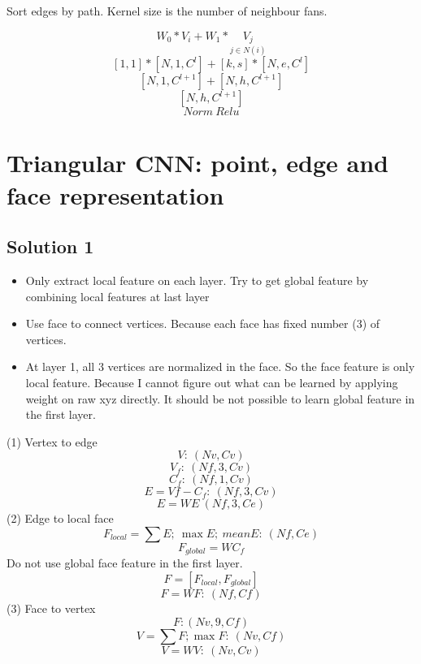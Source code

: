 \documentclass[,table,dvipsnames]{article}
\begin{document}
Sort edges by path. Kernel size is the number of neighbour fans.

$$ W_0 * V_i + W_1 *  \underset{j\in N(i)}{V_j} $$
$$ [1,1]*[N,1,C^l] + [k,s]*[N,e,C^l] $$
$$ [N,1,C^{l+1}]+ [N,h,C^{l+1}] $$ 
$$ [N,h,C^{l+1}] $$
$$ Norm\ Relu $$



\section{Triangular CNN: point, edge and face representation}


\newpage
\subsection{Solution 1}
\begin{itemize}
	\item Only extract local feature on each layer. Try to get global feature by combining local features at last layer
	\item Use face to connect vertices. Because each face has fixed number (3) of vertices. 
	\item At layer 1, all 3 vertices are normalized in the face. So the face feature is only local feature. Because I cannot figure out what can be learned by applying weight on raw xyz directly. It should be not possible to learn global feature in the first layer.
\end{itemize}
\noindent

(1) Vertex to edge
$$ V:\ (Nv,Cv)$$
$$ V_f:\ (Nf,3,Cv)$$
$$ C_f:\ (Nf,1,Cv)$$
$$ E = Vf-C_f:\ (Nf,3,Cv)$$
$$ E = WE\ (Nf,3,Ce)$$
(2) Edge to local face
$$ F_{local} = \sum E;\  \max E;\  mean E :\ (Nf,Ce)$$
$$ F_{global} = WC_f$$
Do not use global face feature in the first layer.
$$ F=[F_{local}, F_{global}] $$
$$ F = WF: \ (Nf,Cf) $$
(3) Face to vertex
$$ F: (Nv, 9, Cf) $$
$$ V = \sum F; \max F:\ (Nv,Cf) $$
$$ V = W V:\ (Nv,Cv) $$
\end{document}
